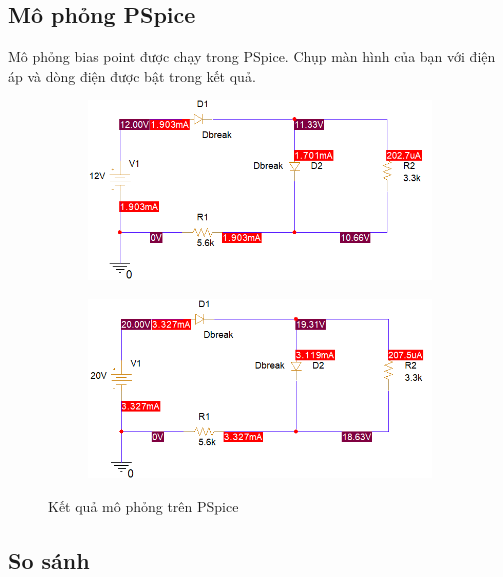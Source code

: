 \subsection{Mô phỏng PSpice}

Mô phỏng bias point được chạy trong PSpice. Chụp màn hình của bạn với điện áp và dòng điện được bật trong kết quả.

\begin{figure}[h]
    \centering
    \begin{subfigure}{0.49\textwidth}
        \centering
        \includegraphics[width=\linewidth]{graphics/ex4/f2.PNG}
    \end{subfigure}
    \hfill
    \begin{subfigure}{0.49\textwidth}
        \centering
        \includegraphics[width=\linewidth]{graphics/ex4/f3.PNG}
    \end{subfigure}
    \caption{Kết quả mô phỏng trên PSpice}
\end{figure}

\subsection{So sánh}

